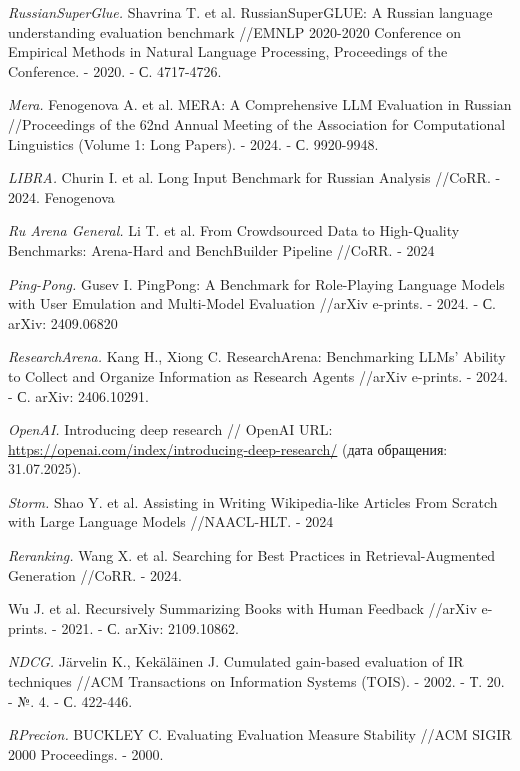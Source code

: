 \documentclass{article}
\begin{document}
\begin{thebibliography}{99}

\textit{RussianSuperGlue.}
Shavrina T. et al. RussianSuperGLUE: A Russian language understanding evaluation benchmark //EMNLP 2020-2020 Conference on Empirical Methods in Natural Language Processing, Proceedings of the Conference. - 2020. - С. 4717-4726.

\textit{Mera.}
Fenogenova A. et al. MERA: A Comprehensive LLM Evaluation in Russian //Proceedings of the 62nd Annual Meeting of the Association for Computational Linguistics (Volume 1: Long Papers). - 2024. - С. 9920-9948.

\textit{LIBRA.}
Churin I. et al. Long Input Benchmark for Russian Analysis //CoRR. - 2024. Fenogenova 

\textit{Ru Arena General.}
Li T. et al. From Crowdsourced Data to High-Quality Benchmarks: Arena-Hard and BenchBuilder Pipeline //CoRR. - 2024

\textit{Ping-Pong.}
Gusev I. PingPong: A Benchmark for Role-Playing Language Models with User Emulation and Multi-Model Evaluation //arXiv e-prints. - 2024. - С. arXiv: 2409.06820

\textit{ResearchArena.}
Kang H., Xiong C. ResearchArena: Benchmarking LLMs' Ability to Collect and Organize Information as Research Agents //arXiv e-prints. - 2024. - С. arXiv: 2406.10291.

\textit{OpenAI.}
Introducing deep research // OpenAI URL: \url{https://openai.com/index/introducing-deep-research/} (дата обращения: 31.07.2025).

\textit{Storm.}
Shao Y. et al. Assisting in Writing Wikipedia-like Articles From Scratch with Large Language Models //NAACL-HLT. - 2024

\textit{Reranking.}
Wang X. et al. Searching for Best Practices in Retrieval-Augmented Generation //CoRR. - 2024.

Wu J. et al. Recursively Summarizing Books with Human Feedback //arXiv e-prints. - 2021. - С. arXiv: 2109.10862.

\textit{NDCG.}
Järvelin K., Kekäläinen J. Cumulated gain-based evaluation of IR techniques //ACM Transactions on Information Systems (TOIS). - 2002. - Т. 20. - №. 4. - С. 422-446.

\textit{RPrecion.}
BUCKLEY C. Evaluating Evaluation Measure Stability //ACM SIGIR 2000 Proceedings. - 2000.


\end{thebibliography}
\end{document}
